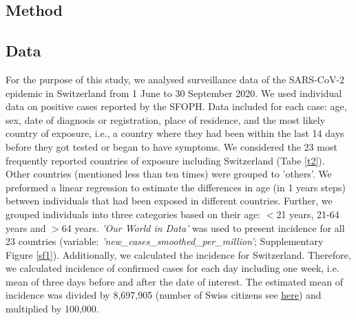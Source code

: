 \documentclass[10pt, a4paper, twoside]{article}
\begin{document}
\begin{multicols}{2}
\section{Method}

\subsection{Data}
For the purpose of this study, we analysed surveillance data of the SARS-CoV-2 epidemic in Switzerland from 1 June to 30 September 2020. 
We used individual data on positive cases reported by the SFOPH. 
Data included for each case: age, sex, date of diagnosis or registration, place of residence, and the most likely country of exposure, i.e., a country where they had been within the last 14 days before they got tested or began to have symptoms.
We considered the 23 most frequently reported countries of exposure including Switzerland (Tabe \ref{t2}).
Other countries (mentioned less than ten times) were grouped to 'others'.
We preformed a linear regression to estimate the differences in age (in 1 years steps) between individuals that had been exposed in different countries.
Further, we grouped individuals into three categories based on their age: $<$21 years, 21-64 years and  $>$64 years.
\textit{'Our World in Data'} was used to present incidence for all 23 countries (variable: \textit{'new\_cases\_smoothed\_per\_million'}; Supplementary Figure \ref{sf1}).\cite{hasell_cross-country_2020}
Additionally, we calculated the incidence for Switzerland.%
Therefore, we calculated incidence of confirmed cases for each day including one week, i.e. mean of three days before and after the date of interest.
The estimated mean of incidence was divided by 8,697,905 (number of Swiss citizens see \href{https://www.worldometers.info/world-population/switzerland-population/}{here}) and multiplied by 100,000.



\end{multicols}
\end{document}
